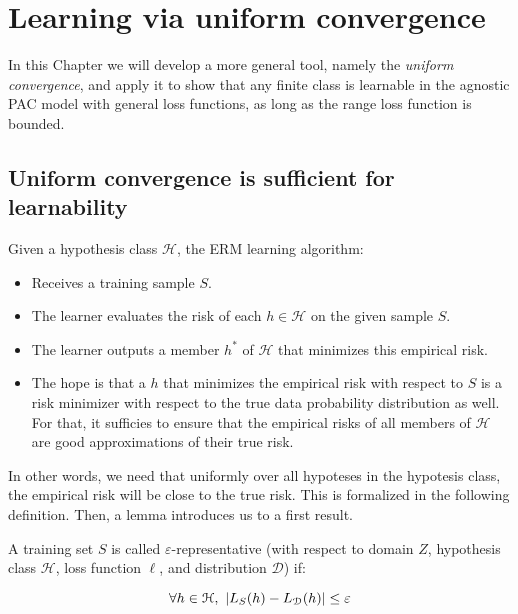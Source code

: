 \documentclass[../../main/main.tex]{subfiles}
\begin{document}
\chapter{Learning via uniform convergence}

In this Chapter we will develop a more general tool, namely the \emph{uniform convergence}, and apply it to show that any finite class is learnable in the agnostic PAC model with general loss functions, as long as the range loss function is bounded.





\section{Uniform convergence is sufficient for learnability}
Given a hypothesis class \( \mathcal{H} \), the ERM learning algorithm:
\begin{itemize}
    \item Receives a training sample \( S \).
	\item The learner evaluates the risk of each \( h \in \mathcal{H} \) on the given sample \( S \).
	\item The learner outputs a member \( h^* \) of \( \mathcal{H} \) that minimizes this empirical risk.
	\item The hope is that a \( h \) that minimizes the empirical risk with respect to \( S \) is a risk minimizer with respect to the true data probability distribution as well.\\
	For that, it sufficies to ensure that the empirical risks of all members of \( \mathcal{H} \) are good approximations of their true risk.
\end{itemize}

In other words, we need that uniformly over all hypoteses in the hypotesis class, the empirical risk will be close to the true risk. This is formalized in the following definition. Then, a lemma introduces us to a first result.

\begin{definition}
	A training set \( S \) is called \( \varepsilon \)-representative (with respect to domain \( Z \), hypothesis class \( \mathcal{H} \), loss function \( \ell \), and distribution \( \mathcal{D} \)) if:

	\begin{equation}
	    \forall h \in \mathcal{H}, \
		\abs{L_S(h) - L_{\mathcal{D}}(h)}
		\le
		\varepsilon
	    \label{eq:C3_ERS}
	\end{equation}
\end{definition}
\end{document}
